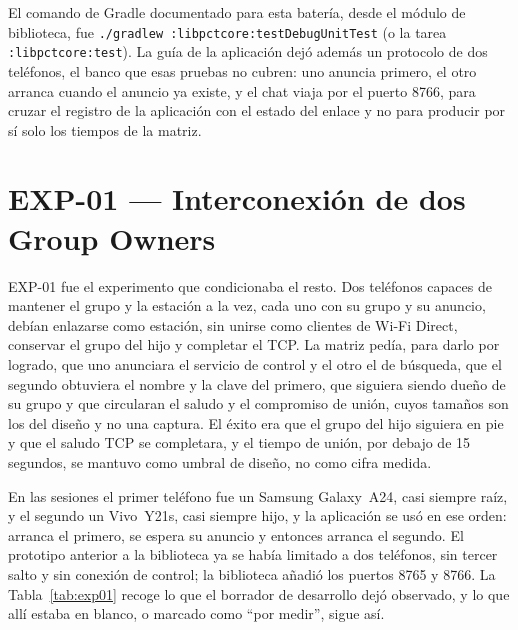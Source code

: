 \documentclass[12pt,oneside]{scrreprt}
\begin{document}
El comando de Gradle documentado para esta batería, desde el módulo de biblioteca, fue \texttt{./gradlew :lib\-pct\-core:test\-Debug\-Unit\-Test} (o la tarea \texttt{:lib\-pct\-core:test}). La guía de la aplicación dejó además un protocolo de dos teléfonos, el banco que esas pruebas no cubren: uno anuncia primero, el otro arranca cuando el anuncio ya existe, y el chat viaja por el puerto 8766, para cruzar el registro de la aplicación con el estado del enlace y no para producir por sí solo los tiempos de la matriz.

\section{EXP-01 --- Interconexión de dos Group Owners}

EXP-01 fue el experimento que condicionaba el resto. Dos teléfonos capaces de mantener el grupo y la estación a la vez, cada uno con su grupo y su anuncio, debían enlazarse como estación, sin unirse como clientes de Wi-Fi Direct, conservar el grupo del hijo y completar el TCP. La matriz pedía, para darlo por logrado, que uno anunciara el servicio de control y el otro el de búsqueda, que el segundo obtuviera el nombre y la clave del primero, que siguiera siendo dueño de su grupo y que circularan el saludo y el compromiso de unión, cuyos tamaños son los del diseño y no una captura. El éxito era que el grupo del hijo siguiera en pie y que el saludo TCP se completara, y el tiempo de unión, por debajo de 15 segundos, se mantuvo como umbral de diseño, no como cifra medida.

En las sesiones el primer teléfono fue un Samsung Galaxy~A24, casi siempre raíz, y el segundo un Vivo~Y21s, casi siempre hijo, y la aplicación se usó en ese orden: arranca el primero, se espera su anuncio y entonces arranca el segundo. El prototipo anterior a la biblioteca ya se había limitado a dos teléfonos, sin tercer salto y sin conexión de control; la biblioteca añadió los puertos 8765 y 8766. La Tabla~\ref{tab:exp01} recoge lo que el borrador de desarrollo dejó observado, y lo que allí estaba en blanco, o marcado como \enquote{por medir}, sigue así.
\end{document}
